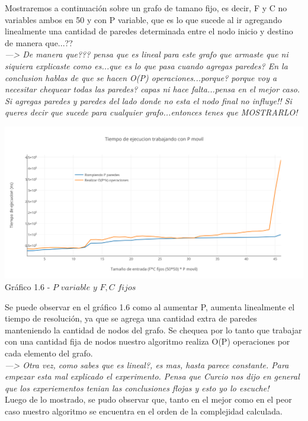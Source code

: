 Mostraremos a continuaci\'on sobre un grafo de tamano fijo, es decir, F y C no variables ambos en 50 y con P variable, que es lo que sucede al ir agregando linealmente una cantidad de paredes determinada entre el nodo inicio y destino de manera que...??\\

\textit{---> De manera que??? pensa que es lineal para este grafo que armaste que ni siquiera explicaste como es...que es lo que pasa cuando agregas paredes? En la conclusion hablas de que se hacen O(P) operaciones...porque? porque voy a necesitar chequear todas las paredes? capas ni hace falta...pensa en el mejor caso. Si agregas paredes y paredes del lado donde no esta el nodo final no influye!! Si queres decir que sucede para cualquier grafo...entonces tenes que MOSTRARLO!}\\

\vspace*{0.3cm} \vspace*{0.3cm}
  \begin{center}
\includegraphics[scale=0.7]{./EJ1/pVariable.png}
{Gr\'afico 1.6 - $P$ $variable$ $y$ $F,C$ $fijos$}
  \end{center}
  \vspace*{0.3cm}

Se puede observar en el gr\'afico 1.6 como al aumentar P, aumenta linealmente el tiempo de resoluci\'on, ya que se agrega una cantidad extra de paredes manteniendo la cantidad de nodos del grafo. Se chequea por lo tanto que trabajar con una cantidad fija de nodos nuestro algoritmo realiza O(P) operaciones por cada elemento del grafo.\\

\textit{---> Otra vez, como sabes que es lineal?, es mas, hasta parece constante. Para empezar esta mal explicado el experimento. Pensa que Curcio nos dijo en general que los experiementos tenian las conclusiones flojas y esto yo lo escuche!}\\

Luego de lo mostrado, se pudo observar que, tanto en el mejor como en el peor caso nuestro algoritmo se encuentra en el orden de la complejidad calculada.
